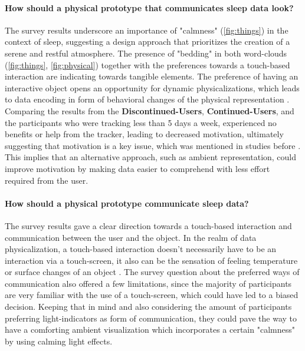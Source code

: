 \documentclass[
  a4paper,  %
  twoside,  %
  bibliography=totoc,
  headsepline,
  cleardoublepage=empty,
  parskip=half,
  draft=false
]{scrbook}
\begin{document}
\paragraph{How should a physical prototype that communicates sleep data look?}
The survey results underscore an importance of "calmness" (\autoref{fig:things}) in the context of sleep, suggesting a design approach that prioritizes the creation of a serene and restful atmosphere. The presence of "bedding" in both word-clouds (\autoref{fig:things}, \autoref{fig:physical}) together with the preferences towards a touch-based interaction are indicating towards tangible elements.
The preference of having an interactive object opens an opportunity for dynamic physicalizations, which leads to data encoding in form of behavioral changes of the physical representation \cite{Representation_Modality_Data_Artifacts,Oppotunieites_Challenges_DataPhysicalization}. Comparing the results from the \textbf{Discontinued-Users}, \textbf{Continued-Users}, and the participants who were tracking less than 5 days a week, experienced no benefits or help from the tracker, leading to decreased motivation, ultimately suggesting that motivation is a key issue, which was mentioned in studies before \cite{Stage_Based_Model, Challenges_Oppotunieties_SleepTracking}. This implies that an alternative approach, such as ambient representation, could improve motivation by making data easier to comprehend with less effort required from the user.

\paragraph{How should a physical prototype communicate sleep data?}
The survey results gave a clear direction towards a touch-based interaction and communication between the user and the object. In the realm of data physicalization, a touch-based interaction doesn't necessarily have to be an interaction via a touch-screen, it also can be the sensation of feeling temperature or surface changes of an object \cite{Oppotunieites_Challenges_DataPhysicalization}. The survey question about the preferred ways of communication also offered a few limitations, since the majority of participants are very familiar with the use of a touch-screen, which could have led to a biased decision. Keeping that in mind and also considering the amount of participants preferring light-indicators as form of communication, they could pave the way to have a comforting ambient visualization which incorporates a certain "calmness" by using calming light effects.
\end{document}
